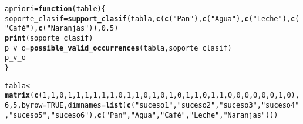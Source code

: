 \documentclass[12pt]{report}\usepackage[]{graphicx}\usepackage[dvipsnames]{xcolor}
\makeatletter
\newcommand{\hlnum}[1]{\textcolor[rgb]{0.686,0.059,0.569}{#1}}%
\newcommand{\hlstr}[1]{\textcolor[rgb]{0.192,0.494,0.8}{#1}}%
\newcommand{\hlstd}[1]{\textcolor[rgb]{0.345,0.345,0.345}{#1}}%
\newcommand{\hlkwa}[1]{\textcolor[rgb]{0.161,0.373,0.58}{\textbf{#1}}}%
\newcommand{\hlkwb}[1]{\textcolor[rgb]{0.69,0.353,0.396}{#1}}%
\newcommand{\hlkwc}[1]{\textcolor[rgb]{0.333,0.667,0.333}{#1}}%
\newcommand{\hlkwd}[1]{\textcolor[rgb]{0.737,0.353,0.396}{\textbf{#1}}}%
\newenvironment{kframe}{%
 \def\at@end@of@kframe{}%
 \ifinner\ifhmode%
  \def\at@end@of@kframe{\end{minipage}}%
  \begin{minipage}{\columnwidth}%
 \fi\fi%
 \def\FrameCommand##1{\hskip\@totalleftmargin \hskip-\fboxsep
 \colorbox{shadecolor}{##1}\hskip-\fboxsep
     \hskip-\linewidth \hskip-\@totalleftmargin \hskip\columnwidth}%
 \MakeFramed {\advance\hsize-\width
   \@totalleftmargin\z@ \linewidth\hsize
   \@setminipage}}%
 {\par\unskip\endMakeFramed%
 \at@end@of@kframe}
\newenvironment{knitrout}{}{} %
\makeatother
\begin{document}
\begin{knitrout}
\begin{kframe}
\begin{alltt}
\hlstd{apriori} \hlkwb{=} \hlkwa{function}\hlstd{(}\hlkwc{table}\hlstd{) \{}
        \hlstd{soporte_clasif} \hlkwb{=} \hlkwd{support_clasif}\hlstd{(tabla,} \hlkwd{c}\hlstd{(}\hlkwd{c}\hlstd{(}\hlstr{"Pan"}\hlstd{),} \hlkwd{c}\hlstd{(}\hlstr{"Agua"}\hlstd{) ,}\hlkwd{c}\hlstd{(}\hlstr{"Leche"}\hlstd{),} \hlkwd{c}\hlstd{(}\hlstr{"Café"}\hlstd{),} \hlkwd{c}\hlstd{(}\hlstr{"Naranjas"}\hlstd{)),} \hlnum{0.5}\hlstd{)}
        \hlkwd{print}\hlstd{(soporte_clasif)}
        \hlstd{p_v_o} \hlkwb{=} \hlkwd{possible_valid_occurrences}\hlstd{(tabla, soporte_clasif)}
        \hlstd{p_v_o}
\hlstd{\}}

\hlstd{tabla} \hlkwb{<-} \hlkwd{matrix}\hlstd{(}\hlkwd{c}\hlstd{(}\hlnum{1}\hlstd{,}\hlnum{1}\hlstd{,}\hlnum{0}\hlstd{,}\hlnum{1}\hlstd{,}\hlnum{1}\hlstd{,} \hlnum{1}\hlstd{,}\hlnum{1}\hlstd{,}\hlnum{1}\hlstd{,}\hlnum{1}\hlstd{,}\hlnum{0}\hlstd{,} \hlnum{1}\hlstd{,}\hlnum{1}\hlstd{,}\hlnum{0}\hlstd{,}\hlnum{1}\hlstd{,}\hlnum{0}\hlstd{,} \hlnum{1}\hlstd{,}\hlnum{0}\hlstd{,}\hlnum{1}\hlstd{,}\hlnum{1}\hlstd{,}\hlnum{0}\hlstd{,} \hlnum{1}\hlstd{,}\hlnum{1}\hlstd{,}\hlnum{0}\hlstd{,}\hlnum{0}\hlstd{,}\hlnum{0}\hlstd{,} \hlnum{0}\hlstd{,}\hlnum{0}\hlstd{,}\hlnum{0}\hlstd{,}\hlnum{1}\hlstd{,}\hlnum{0}\hlstd{),}\hlnum{6}\hlstd{,}\hlnum{5}\hlstd{,}\hlkwc{byrow}\hlstd{=}\hlnum{TRUE}\hlstd{,}\hlkwc{dimnames}\hlstd{=}\hlkwd{list}\hlstd{(}\hlkwd{c}\hlstd{(}\hlstr{"suceso1"}\hlstd{,}\hlstr{"suceso2"}\hlstd{,}\hlstr{"suceso3"}\hlstd{,}\hlstr{"suceso4"}\hlstd{,}\hlstr{"suceso5"}\hlstd{,}\hlstr{"suceso6"}\hlstd{),}\hlkwd{c}\hlstd{(}\hlstr{"Pan"}\hlstd{,}\hlstr{"Agua"}\hlstd{,}\hlstr{"Café"}\hlstd{,}\hlstr{"Leche"}\hlstd{,}\hlstr{"Naranjas"}\hlstd{)))}


\end{alltt}
\end{kframe}
\end{knitrout}
\end{document}
